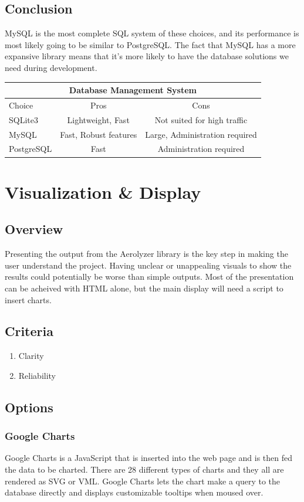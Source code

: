 \documentclass[onecolumn, draftclsnofoot,10pt, compsoc]{IEEEtran}
\begin{document}
\begin{singlespace}
\subsection{Conclusion}
MySQL is the most complete SQL system of these choices, and its performance is most likely going to be similar to PostgreSQL.
The fact that MySQL has a more expansive library means that it's more likely to have the database solutions we need during development.
\begin{center}
	\begin{tabular}{|l|c|c|} 
		\hline
		\multicolumn{3}{|c|}{Database Management System} \\
		\hline
		Choice & Pros & Cons\\ [0.5ex] 
		\hline\hline
		SQLite3 & Lightweight, Fast & Not suited for high traffic \\ 
		\hline
		MySQL & Fast, Robust features & Large, Administration required \\
		\hline
		PostgreSQL & Fast & Administration required\\ [1ex] 
		\hline
	\end{tabular}
\end{center}


\section{Visualization \& Display}
\subsection{Overview}
Presenting the output from the Aerolyzer library is the key step in making the user understand the project.
Having unclear or unappealing visuals to show the results could potentially be worse than simple outputs.
Most of the presentation can be acheived with HTML alone, but the main display will need a script to insert charts.
\subsection{Criteria}
\begin{enumerate}
	\item Clarity
	\item Reliability
\end{enumerate}
\subsection{Options}
\subsubsection{Google Charts}
Google Charts is a JavaScript that is inserted into the web page and is then fed the data to be charted.
There are 28 different types of charts and they all are rendered as SVG or VML.
Google Charts lets the chart make a query to the database directly and displays customizable tooltips when moused over.\cite{GoogleCh}

\end{singlespace}
\end{document}
